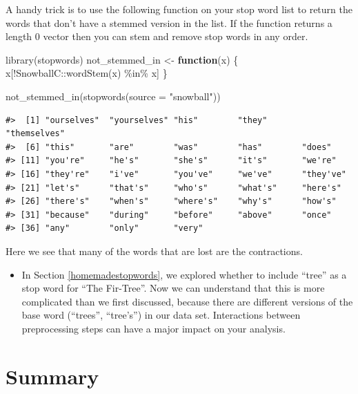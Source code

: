 \documentclass[
]{krantz}
\makeatletter
\newenvironment{Shaded}{\begin{snugshade}}{\end{snugshade}}
\newcommand{\AttributeTok}[1]{\textcolor[rgb]{0.77,0.63,0.00}{#1}}
\newcommand{\ControlFlowTok}[1]{\textcolor[rgb]{0.13,0.29,0.53}{\textbf{#1}}}
\newcommand{\FunctionTok}[1]{\textcolor[rgb]{0.00,0.00,0.00}{#1}}
\newcommand{\NormalTok}[1]{#1}
\newcommand{\OtherTok}[1]{\textcolor[rgb]{0.56,0.35,0.01}{#1}}
\newcommand{\SpecialCharTok}[1]{\textcolor[rgb]{0.00,0.00,0.00}{#1}}
\newcommand{\StringTok}[1]{\textcolor[rgb]{0.31,0.60,0.02}{#1}}
\newenvironment{kframe}{%
\medskip{}
\setlength{\fboxsep}{.8em}
 \def\at@end@of@kframe{}%
 \ifinner\ifhmode%
  \def\at@end@of@kframe{\end{minipage}}%
  \begin{minipage}{\columnwidth}%
 \fi\fi%
 \def\FrameCommand##1{\hskip\@totalleftmargin \hskip-\fboxsep
 \colorbox{shadecolor}{##1}\hskip-\fboxsep
     \hskip-\linewidth \hskip-\@totalleftmargin \hskip\columnwidth}%
 \MakeFramed {\advance\hsize-\width
   \@totalleftmargin\z@ \linewidth\hsize
   \@setminipage}}%
 {\par\unskip\endMakeFramed%
 \at@end@of@kframe}
\renewenvironment{Shaded}{\begin{kframe}}{\end{kframe}}
\newenvironment{rmdblock}[1]
  {\begin{shaded*}
  \begin{itemize}[left = -1cm, labelsep = 1cm]
  \renewcommand{\labelitemi}{
    \raisebox{-.7\height}[0pt][0pt]{
      {\setkeys{Gin}{width=3em,keepaspectratio}\texttt{[image: images/\#1]}}
    }
  }
 
  \item
  }
  {
  \end{itemize}
  \end{shaded*}
  }
\newenvironment{rmdwarning}
  {\begin{rmdblock}{warning}}
  {\end{rmdblock}}
\makeatother
\begin{document}
A handy trick is to use the following function on your stop word list to return the words that don't have a stemmed version in the list. If the function returns a length 0 vector then you can stem and remove stop words in any order.

\begin{Shaded}
\begin{Highlighting}[]
\FunctionTok{library}\NormalTok{(stopwords)}
\NormalTok{not\_stemmed\_in }\OtherTok{\textless{}{-}} \ControlFlowTok{function}\NormalTok{(x) \{}
\NormalTok{  x[}\SpecialCharTok{!}\NormalTok{SnowballC}\SpecialCharTok{::}\FunctionTok{wordStem}\NormalTok{(x) }\SpecialCharTok{\%in\%}\NormalTok{ x]}
\NormalTok{\}}

\FunctionTok{not\_stemmed\_in}\NormalTok{(}\FunctionTok{stopwords}\NormalTok{(}\AttributeTok{source =} \StringTok{"snowball"}\NormalTok{))}
\end{Highlighting}
\end{Shaded}

\begin{verbatim}
#>  [1] "ourselves"  "yourselves" "his"        "they"       "themselves"
#>  [6] "this"       "are"        "was"        "has"        "does"      
#> [11] "you're"     "he's"       "she's"      "it's"       "we're"     
#> [16] "they're"    "i've"       "you've"     "we've"      "they've"   
#> [21] "let's"      "that's"     "who's"      "what's"     "here's"    
#> [26] "there's"    "when's"     "where's"    "why's"      "how's"     
#> [31] "because"    "during"     "before"     "above"      "once"      
#> [36] "any"        "only"       "very"
\end{verbatim}

Here we see that many of the words that are lost are the contractions.

\begin{rmdwarning}
In Section \ref{homemadestopwords}, we explored whether to include ``tree'' as a stop word for ``The Fir-Tree''. Now we can understand that this is more complicated than we first discussed, because there are different versions of the base word (``trees'', ``tree's'') in our data set. Interactions between preprocessing steps can have a major impact on your analysis.
\end{rmdwarning}

\hypertarget{stemmingsummary}{%
\section{Summary}\label{stemmingsummary}}
\end{document}

